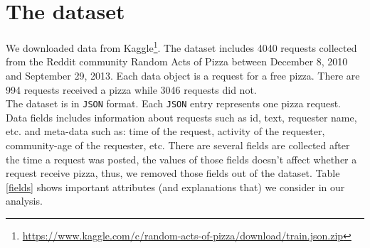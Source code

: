 \section{The dataset}
We downloaded data from Kaggle\footnote{\url{https://www.kaggle.com/c/random-acts-of-pizza/download/train.json.zip}}. The dataset includes 4040 requests collected from the Reddit community Random Acts of Pizza between December 8, 2010 and September 29, 2013. Each data object is a request for a free pizza. There are 994 requests received a pizza while 3046 requests did not. \\

The dataset is in \texttt{JSON} format. Each \texttt{JSON} entry represents one pizza request. Data fields includes information about requests such as id, text, requester name, etc. and meta-data such as: time of the request, activity of the requester, community-age of the requester, etc. There are several fields are collected after the time a request was posted, the values of those fields doesn't affect whether a request receive pizza, thus, we removed those fields out of the dataset. Table \ref{fields} shows important attributes (and explanations that) we consider in our analysis.

